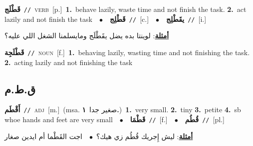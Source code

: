 \documentclass[10pt,a4paper,twoside]{article} %
\begin{document}
\begin{multicols}{2}
{\setlength\topsep{0pt}\textbf{\foreignlanguage{arabic}{قَطْلَج}}\ {\color{gray}\texttt{//}\color{black}}\ \textsc{verb}\ [p.]\ \textbf{1.}~behave lazily, waste time and not finish the task.  \textbf{2.}~act lazily and not finish the task\ \ $\bullet$\ \ \setlength\topsep{0pt}\textbf{\foreignlanguage{arabic}{قَطْلِج}}\ {\color{gray}\texttt{//}\color{black}}\ [c.]\ \ $\bullet$\ \ \setlength\topsep{0pt}\textbf{\foreignlanguage{arabic}{يقَطْلِج}}\ {\color{gray}\texttt{//}\color{black}}\ [i.]\  \begin{flushright}\color{gray}\foreignlanguage{arabic}{\textbf{\underline{\foreignlanguage{arabic}{أمثلة}}}: لوينتا بده يضل يقَطْلَج ومايسلمنا الشغل اللي عليه؟}\end{flushright}\color{black}} \vspace{2mm}

{\setlength\topsep{0pt}\textbf{\foreignlanguage{arabic}{قَطْلَجِة}}\ {\color{gray}\texttt{//}\color{black}}\ \textsc{noun}\ [f.]\ \textbf{1.}~behaving lazily, wasting time and not finishing the task.  \textbf{2.}~acting lazily and not finishing the task\ } \vspace{2mm}

\vspace{-3mm}
\subsection*{\color{blue}\foreignlanguage{arabic}{ق.ط.م}\color{blue}{}} 

{\setlength\topsep{0pt}\textbf{\foreignlanguage{arabic}{أَقْطَم}}\ {\color{gray}\texttt{//}\color{black}}\ \textsc{adj}\ [m.]\ \color{gray}(msa. \foreignlanguage{arabic}{صغير جدا}~\foreignlanguage{arabic}{\textbf{١.}})\color{black}\ \textbf{1.}~very small.  \textbf{2.}~tiny  \textbf{3.}~petite  \textbf{4.}~sb whoe hands and feet are very small\ \ $\bullet$\ \ \setlength\topsep{0pt}\textbf{\foreignlanguage{arabic}{قَطْمَا}}\ {\color{gray}\texttt{//}\color{black}}\ [f.]\ \ $\bullet$\ \ \setlength\topsep{0pt}\textbf{\foreignlanguage{arabic}{قُطُم}}\ {\color{gray}\texttt{//}\color{black}}\ [pl.]\  \begin{flushright}\color{gray}\foreignlanguage{arabic}{\textbf{\underline{\foreignlanguage{arabic}{أمثلة}}}: ليش إِجريك قُطُم زي هيك؟\ $\bullet$\ \  اجت القَطْما أم ايدين صغار}\end{flushright}\color{black}} \vspace{2mm}


\end{multicols}
\end{document}

